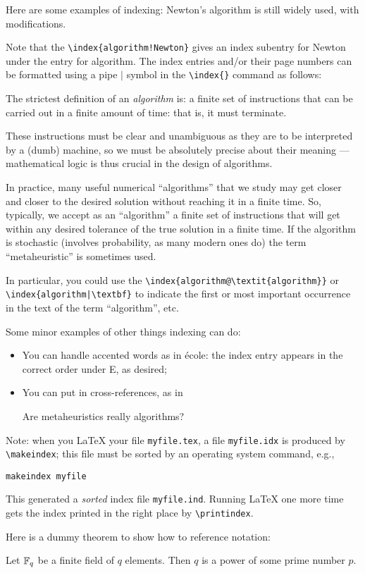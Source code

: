 Here are some examples of indexing: Newton's algorithm is 
still widely used, with modifications.  

Note that the \verb|\index{algorithm!Newton}| gives an index subentry for Newton under the entry for algorithm.
The index entries and/or their page numbers can be formatted using a pipe $|$ symbol in the \verb!\index{}! 
command as follows:

\begin{defn}
The strictest definition of an \emph{algorithm} is: a finite set of instructions 
that can be carried out in a finite amount of time: that is, it must terminate.

These instructions must be clear and unambiguous as they are to be interpreted by a (dumb) 
machine, so we must be absolutely precise about their meaning --- mathematical logic is 
thus crucial in the design of algorithms.
\end{defn}

In practice, many useful numerical ``algorithms'' that we study may get closer and closer 
to the desired solution without reaching it in a finite time.  So, typically, we accept as an 
``algorithm'' a finite set of instructions that will get within any desired tolerance 
of the true solution in a finite time.
If the algorithm is stochastic (involves probability, as many modern ones do) the term 
``metaheuristic'' is sometimes used.

In particular, you could use the \verb|\index{algorithm@\textit{algorithm}}| or \verb!\index{algorithm|\textbf}! to
indicate the first or most important occurrence in the text of the term ``algorithm'', etc.

Some minor examples of other things indexing can do:
\begin{itemize}
\item You can handle accented words as in \'ecole: the index entry appears in the correct 
order under E, as desired;
\item You can put in cross-references, as in 

Are metaheuristics really algorithms?
\end{itemize}

Note: when you LaTeX your file \texttt{myfile.tex}, a file \texttt{myfile.idx} is produced by \verb|\makeindex|; 
this file must be sorted by an operating system command, e.g.,

\texttt{makeindex myfile} 

This generated a \emph{sorted} index file \texttt{myfile.ind}.  Running LaTeX one more time gets the index printed 
in the right place by \verb|\printindex|.

Here is a dummy theorem to show how to reference notation:
\begin{thm}\label{Th.FF.fte.field}
Let $\mathbb{F}_q$ be a finite field of $q$ elements.  Then $q$ is a power of some prime number $p$.
\end{thm}

